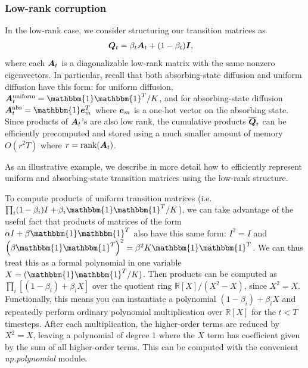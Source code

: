 \subsubsection{Low-rank corruption}

\label{appendix:low_rank_corruption}
In the low-rank case, we consider structuring our transition matrices as
\begin{align}
\boldsymbol{Q}_t &= \beta_t \boldsymbol{A}_t + (1 - \beta_t) \boldsymbol{I},
\end{align}
where each $\boldsymbol{A}_t$ is a diagonalizable low-rank matrix with the same nonzero eigenvectors. In particular, recall that both absorbing-state diffusion and uniform diffusion
have this form: for uniform diffusion, $\bs{A}^\text{uniform}_t = \mathbbm{1}\mathbbm{1}^T/K$, and for absorbing-state diffusion $\bs{A}^\text{abs}_t = \mathbbm{1}\bs{e}_{m}^T$ where $\boldsymbol{e}_{m}$ is a one-hot vector on the absorbing state. Since products of $\boldsymbol{A}_t$'s are also low rank, the cumulative products $\overline{\boldsymbol{Q}}_t$ can be efficiently precomputed and stored using a much smaller amount of memory $O(r^2 T)$ where $r = \text{rank}(\boldsymbol{A}_t)$.


As an illustrative example, we describe in more detail how to efficiently represent uniform and absorbing-state transition matrices using the low-rank structure.

To compute products of uniform transition matrices (i.e. $\prod_i (1-\beta_i) I + \beta_i \mathbbm{1} \mathbbm{1}^T / K$), 
we can take advantage of the useful fact that products of matrices of the form $\alpha I + \beta \mathbbm{1} \mathbbm{1}^T$ also have this same form: $I^2=I$ and $\left(\beta \mathbbm{1} \mathbbm{1}^T\right)^2 = \beta^2 K  \mathbbm{1} \mathbbm{1}^T$. We can thus treat this as a formal polynomial in one variable $X = (\mathbbm{1} \mathbbm{1}^T /K)$. Then products can be computed as $\prod_i\left[(1-\beta_i) + \beta_i X\right]$ over the quotient ring $\mathbb{R}[X] / (X^2 - X)$, since $X^2=X$. Functionally, this means you can instantiate a polynomial $(1-\beta_i) + \beta_i X$ and repeatedly perform ordinary polynomial multiplication over $\mathbb{R}[X]$ for the $t < T$ timesteps. After each multiplication, the higher-order terms are reduced by $X^2=X$, leaving a polynomial of degree 1 where the $X$ term has coefficient given by the sum of all higher-order terms. This can be computed with the convenient \textit{np.polynomial} module.

